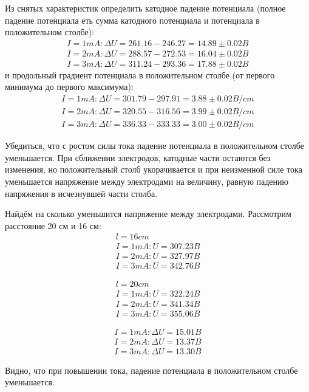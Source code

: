 Из снятых характеристик определить катодное падение потенциала (полное 
падение потенциала еть сумма катодного потенциала и потенциала в 
положительном столбе):
\begin{gather*}
	I = 1 mA: \Delta U = 261.16-246.27=14.89 \pm 0.02 B \\ 
	I = 2 mA: \Delta U = 288.57-272.53=16.04 \pm 0.02 B \\
	I = 3 mA: \Delta U = 311.24-293.36=17.88 \pm 0.02 B 
\end{gather*}
и продольный градиент потенциала в положительном столбе (от первого 
минимума до первого максимума):
\begin{gather*}
	I = 1 mA: \Delta U = 301.79-297.91=3.88 \pm 0.02 B/cm \\
	I = 2 mA: \Delta U = 320.55-316.56=3.99 \pm 0.02 B/cm \\
	I = 3 mA: \Delta U = 336.33-333.33=3.00 \pm 0.02 B/cm
\end{gather*}

Убедиться, что с ростом силы тока падение потенциала в положительном 
столбе уменьшается. При сближении электродов, катодные части остаются 
без изменения, но положительный столб укорачивается и при неизменной 
силе тока уменьшается напряжение между электродами на величину, равную 
падению напряжения в исчезнувшей части столба.

Найдём на сколько уменьшится напряжение между электродами. Рассмотрим 
расстояние 20 см и 16 см:
\begin{gather*}
	l = 16 cm \\
	I = 1 mA: U = 307.23 B \\
	I = 2 mA: U = 327.97 B \\
	I = 3 mA: U = 342.76 B
\end{gather*}

\begin{gather*}
	l = 20 cm \\
	I = 1 mA: U = 322.24 B \\
	I = 2 mA: U = 341.34 B \\
	I = 3 mA: U = 355.06 B
\end{gather*}

\begin{gather*}
	I = 1 mA: \Delta U = 15.01 B \\
	I = 2 mA: \Delta U = 13.37 B \\
	I = 3 mA: \Delta U = 13.30 B
\end{gather*}

Видно, что при повышении тока, падение потенциала в положительном 
столбе уменьшается.

